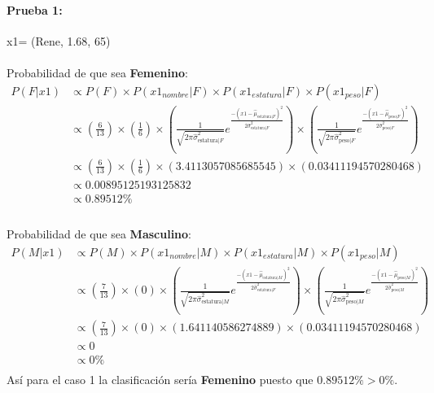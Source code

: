 \documentclass[12pt]{article}
\begin{document}
 \paragraph{Prueba 1: }x1= (Rene, 1.68, 65)
 \paragraph{}Probabilidad de que sea \textbf{Femenino}:\\
 \begin{equation}
 \begin{split}
 P(F|x1) &\propto P(F) \times P(x1_{nombre}|F) \times P(x1_{estatura}|F) \times P(x1_{peso}|F) \\
 &\propto (\frac{6}{13}) \times (\frac{1}{6}) \times (\frac{1}{\sqrt{2\pi\hat{\sigma}_{\text{estatura}|F}^2}}e^{\frac{-(x1 - \hat{\mu}_{\text{estatura}|F})^2}{2\hat{\sigma}_{\text{estatura}|F}^2}}) \times (\frac{1}{\sqrt{2\pi\hat{\sigma}_{\text{peso}|F}^2}}e^{\frac{-(x1 - \hat{\mu}_{\text{peso}|F})^2}{2\hat{\sigma}_{\text{peso}|F}^2}}) \\
 &\propto (\frac{6}{13}) \times (\frac{1}{6}) \times (3.4113057085685545) \times (0.03411194570280468) \\
 &\propto 0.00895125193125832 \\
 &\propto 0.89512\% \\
 \end{split}
 \end{equation}
 \paragraph{}Probabilidad de que sea \textbf{Masculino}:\\
 \begin{equation}
 \begin{split}
 P(M|x1) &\propto P(M) \times P(x1_{nombre}|M) \times P(x1_{estatura}|M) \times P(x1_{peso}|M) \\
 &\propto (\frac{7}{13}) \times (0) \times (\frac{1}{\sqrt{2\pi\hat{\sigma}_{\text{estatura}|M}^2}}e^{\frac{-(x1 - \hat{\mu}_{\text{estatura}|M})^2}{2\hat{\sigma}_{\text{estatura}|F}^2}}) \times (\frac{1}{\sqrt{2\pi\hat{\sigma}_{\text{peso}|M}^2}}e^{\frac{-(x1 - \hat{\mu}_{\text{peso}|M})^2}{2\hat{\sigma}_{\text{peso}|M}^2}}) \\
 &\propto (\frac{7}{13}) \times (0) \times (1.641140586274889) \times (0.03411194570280468) \\
 &\propto 0 \\
 &\propto 0 \% \\
 \end{split}
 \end{equation}
 Así para el caso 1 la clasificación sería \textbf{Femenino} puesto que $0.89512\% > 0\%$.\\
 \clearpage
 \pagebreak
\end{document}
